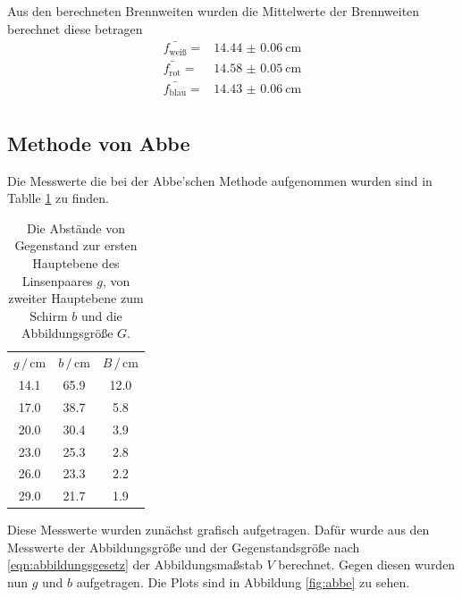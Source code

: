 Aus den berechneten Brennweiten wurden die Mittelwerte der Brennweiten berechnet diese betragen
\begin{align*}
    \bar{f_\text{weiß}} = & \SI{14.44(6)}{\centi\meter} \\
    \bar{f_\text{rot}}  = & \SI{14.58(5)}{\centi\meter} \\
    \bar{f_\text{blau}} = &  \SI{14.43(6)}{\centi\meter} \\
\end{align*}


\subsection{Methode von Abbe}

Die Messwerte die bei der Abbe'schen Methode aufgenommen wurden sind in Tablle \ref{tab:abbe} zu finden.
\begin{table}
    \centering
    \begin{tabular}{ccc}
        \toprule
        $g \,/\, \si{\centi\meter} $&$ b\,/\, \si{\centi\meter} $&$ B \,/\, \si{\centi\meter} $\\
        14.1 & 65.9 & 12.0   \\
        17.0 & 38.7 & 5.8 \\
        20.0 & 30.4 & 3.9 \\
        23.0 & 25.3 & 2.8 \\
        26.0 & 23.3 & 2.2 \\
        29.0 & 21.7 & 1.9 \\
    \end{tabular}
    \caption{Die Abstände von Gegenstand zur ersten Hauptebene des Linsenpaares $g$, von zweiter Hauptebene zum Schirm $b$ und die Abbildungsgröße $G$.}
    \label{tab:abbe}
\end{table}

Diese Messwerte wurden zunächst grafisch aufgetragen.
Dafür wurde aus den Messwerte der Abbildungsgröße und der Gegenstandsgröße nach \eqref{eqn:abbildungsgesetz} der Abbildungsmaßstab $V$ berechnet.
Gegen diesen wurden nun $g$ und $b$ aufgetragen. 
Die Plots sind in Abbildung \ref{fig:abbe} zu sehen.

